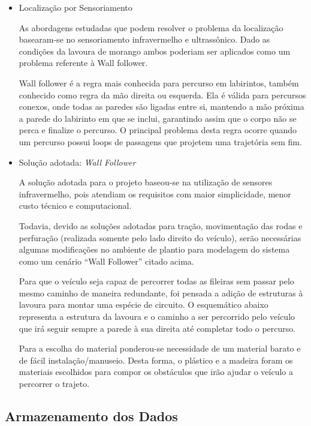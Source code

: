 \begin{itemize}
 \item Localização por Sensoriamento

  As abordagens estudadas que podem resolver o problema da localização
  basearam-se no sensoriamento infravermelho e ultrassônico.
  Dado as condições da lavoura de morango ambos poderiam ser
  aplicados como um problema referente à Wall follower.
  
  Wall follower é a regra mais conhecida para percurso em labirintos,
  também conhecido como regra da mão direita ou esquerda.
  Ela é válida para percursos conexos, onde todas as paredes são
  ligadas entre si, mantendo a mão próxima a parede do labirinto em
  que se inclui, garantindo assim que o corpo não se perca e finalize
  o percurso. O principal problema desta regra ocorre quando um percurso
  possui loops de passagens que projetem uma trajetória sem fim.

 \item Solução adotada: \textit{Wall Follower}

  A solução adotada para o projeto baseou-se na utilização de sensores
  infravermelho, pois atendiam os requisitos com maior simplicidade,
  menor custo técnico e computacional.
  
  Todavia, devido as soluções adotadas para tração, movimentação das
  rodas e perfuração (realizada somente pelo lado direito do veículo),
  serão necessárias algumas modificações no ambiente de plantio para modelagem
  do sistema como um cenário “Wall Follower” citado acima.
  
  Para que o veículo seja capaz de percorrer todas as fileiras sem passar
  pelo mesmo caminho de maneira redundante, foi pensada a adição de
  estruturas à lavoura para montar uma espécie de circuito. O esquemático
  abaixo representa a estrutura da lavoura e o caminho a ser percorrido pelo
  veículo que irá seguir sempre a parede à sua direita até completar todo o
  percurso.

  Para a escolha do material ponderou-se necessidade de um material
  barato e de fácil instalação/manuseio. Desta forma, o plástico e
  a madeira foram os materiais escolhidos para compor os obstáculos
  que irão ajudar o veículo a percorrer o trajeto.

\end{itemize}

  \subsection{Armazenamento dos Dados}

